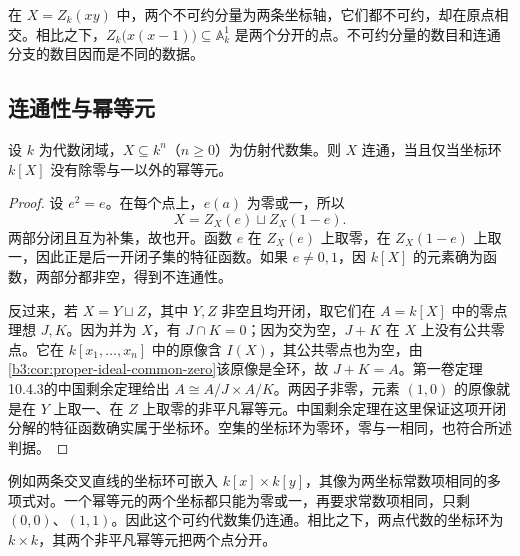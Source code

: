在 \(X=Z_k(xy)\) 中，两个不可约分量为两条坐标轴，它们都不可约，却在原点相交。相比之下，\(Z_k\bigl(x(x-1)\bigr)\subseteq\mathbb A_k^1\) 是两个分开的点。不可约分量的数目和连通分支的数目因而是不同的数据。

\subsection{连通性与幂等元}
\label{b3:subsec:0701:03}

\begin{theorem}\label{b3:thm:affine-connected-idempotents}
	设 \(k\) 为代数闭域，\(X\subseteq k^n\)（\(n\ge0\)）为仿射代数集。则 \(X\) 连通，当且仅当坐标环 \(k[X]\) 没有除零与一以外的幂等元。
\end{theorem}
\begin{proof}
	设 \(e^2=e\)。在每个点上，\(e(a)\) 为零或一，所以
	\[
		X=Z_X(e)\sqcup Z_X(1-e).
	\]
	两部分闭且互为补集，故也开。函数 \(e\) 在 \(Z_X(e)\) 上取零，在 \(Z_X(1-e)\) 上取一，因此正是后一开闭子集的特征函数。如果 \(e\ne0,1\)，因 \(k[X]\) 的元素确为函数，两部分都非空，得到不连通性。

	反过来，若 \(X=Y\sqcup Z\)，其中 \(Y,Z\) 非空且均开闭，取它们在 \(A=k[X]\) 中的零点理想 \(J,K\)。因为并为 \(X\)，有 \(J\cap K=0\)；因为交为空，\(J+K\) 在 \(X\) 上没有公共零点。它在 \(k[x_1,\ldots,x_n]\) 中的原像含 \(I(X)\)，其公共零点也为空，由\cref{b3:cor:proper-ideal-common-zero}该原像是全环，故 \(J+K=A\)。第一卷定理10.4.3的中国剩余定理给出 \(A\cong A/J\times A/K\)。两因子非零，元素 \((1,0)\) 的原像就是在 \(Y\) 上取一、在 \(Z\) 上取零的非平凡幂等元。中国剩余定理在这里保证这项开闭分解的特征函数确实属于坐标环。空集的坐标环为零环，零与一相同，也符合所述判据。
\end{proof}

例如两条交叉直线的坐标环可嵌入 \(k[x]\times k[y]\)，其像为两坐标常数项相同的多项式对。一个幂等元的两个坐标都只能为零或一，再要求常数项相同，只剩 \((0,0)\)、\((1,1)\)。因此这个可约代数集仍连通。相比之下，两点代数的坐标环为 \(k\times k\)，其两个非平凡幂等元把两个点分开。
